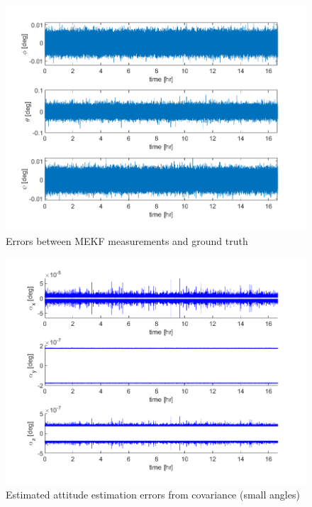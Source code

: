 \begin{figure}[H]
\centering
\includegraphics[scale=0.8]{Images/ps8_problem7_error.png}
\caption{Errors between MEKF measurements and ground truth}
\label{fig:ps8_problem7_error}
\end{figure}

\begin{figure}[H]
\centering
\includegraphics[scale=0.8]{Images/ps8_problem7_cov.png}
\caption{Estimated attitude estimation errors from covariance (small angles)}
\label{fig:ps8_problem7_cov}
\end{figure}

